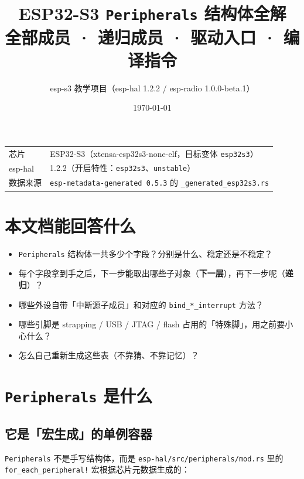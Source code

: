 \documentclass[UTF8,a4paper,11pt,fontset=fandol]{ctexart}
\title{\bfseries ESP32-S3 \texttt{Peripherals} 结构体全解\\[4pt]
       \large 全部成员 · 递归成员 · 驱动入口 · 编译指令}
\author{esp-s3 教学项目（esp-hal 1.2.2 / esp-radio 1.0.0-beta.1）}
\date{\today}
\newcommand{\fld}[1]{\texttt{#1}}
\begin{document}
\sloppy
\maketitle

\begin{center}
\begin{tabular}{@{}ll@{}}
\toprule
芯片 & ESP32-S3（xtensa-esp32s3-none-elf，目标变体 \texttt{esp32s3}）\\
esp-hal & 1.2.2（开启特性：\texttt{esp32s3}、\texttt{unstable}）\\
数据来源 & \texttt{esp-metadata-generated 0.5.3} 的 \texttt{\_generated\_esp32s3.rs}\\
\bottomrule
\end{tabular}
\end{center}

\section*{本文档能回答什么}
\begin{itemize}
  \item \fld{Peripherals} 结构体一共多少个字段？分别是什么、稳定还是不稳定？
  \item 每个字段拿到手之后，下一步能取出哪些子对象（\textbf{下一层}），再下一步呢（\textbf{递归}）？
  \item 哪些外设自带「中断源子成员」和对应的 \fld{bind\_*\_interrupt} 方法？
  \item 哪些引脚是 strapping / USB / JTAG / flash 占用的「特殊脚」，用之前要小心什么？
  \item 怎么自己重新生成这些表（不靠猜、不靠记忆）？
\end{itemize}

\tableofcontents
\newpage

\section{\texttt{Peripherals} 是什么}

\subsection{它是「宏生成」的单例容器}

\fld{Peripherals} 不是手写结构体，而是 \fld{esp-hal/src/peripherals/mod.rs} 里的
\fld{for\_each\_peripheral!} 宏根据芯片元数据生成的：
\end{document}
